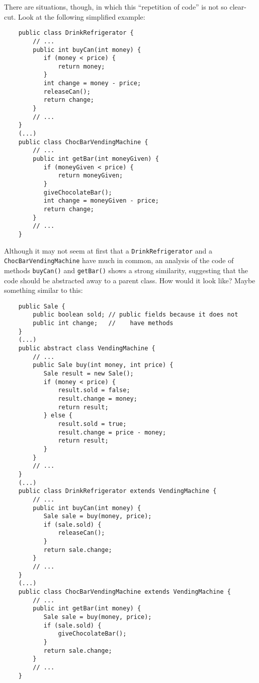 {There are situations, though, in which this ``repetition of code'' is not so clear-cut. Look at the
following simplified example:  

\begin{verbatim}
    public class DrinkRefrigerator {
        // ...
        public int buyCan(int money) {
           if (money < price) {
               return money;
           } 
           int change = money - price;
           releaseCan();
           return change;
        }
        // ...
    }
    (...)
    public class ChocBarVendingMachine {
        // ...
        public int getBar(int moneyGiven) {
           if (moneyGiven < price) {
               return moneyGiven;
           } 
           giveChocolateBar();
           int change = moneyGiven - price;
           return change;
        }
        // ...
    }
\end{verbatim}

Although it may not seem at first that a \verb+DrinkRefrigerator+ and
a \verb+ChocBarVendingMachine+ have much in common, an analysis of the
code of methods \verb+buyCan()+ and \verb+getBar()+ shows a strong
similarity, suggesting that the code should be abstracted away to a
parent class. How would it look like? Maybe something similar to this: 

\begin{verbatim}
    public Sale {
        public boolean sold; // public fields because it does not
        public int change;   //    have methods
    }
    (...)
    public abstract class VendingMachine {
        // ...
        public Sale buy(int money, int price) {
           Sale result = new Sale();
           if (money < price) {
               result.sold = false;
               result.change = money;
               return result;
           } else {
               result.sold = true;
               result.change = price - money;
               return result;
           }
        }
        // ...
    }
    (...)
    public class DrinkRefrigerator extends VendingMachine {
        // ...
        public int buyCan(int money) {
           Sale sale = buy(money, price);
           if (sale.sold) {
               releaseCan();
           } 
           return sale.change;
        }
        // ...
    }
    (...)
    public class ChocBarVendingMachine extends VendingMachine {
        // ...
        public int getBar(int money) {
           Sale sale = buy(money, price);
           if (sale.sold) {
               giveChocolateBar();
           }
           return sale.change;
        }
        // ...
    }
\end{verbatim}

}
